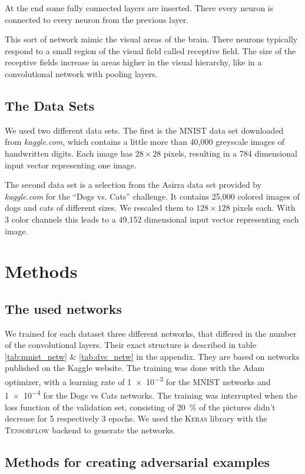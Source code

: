 \documentclass[%
 reprint,
 amsmath,amssymb,
 aps,
]{revtex4-1}
\begin{document}
At the end some fully connected layers are inserted. There every neuron is connected to every neuron from the previous layer.

This sort of network mimic the visual areas of the brain. There neurons typically respond to a small region of the visual field called receptive field. The size of the receptive fields increase in areas higher in the visual hierarchy, like in a convolutional network with pooling layers.

\subsection{The Data Sets}

We used two different data sets. The first is the MNIST data set downloaded from \emph{kaggle.com}, which contains a little more than 40,000 greyscale images of handwritten digits. Each image has $28\times 28$ pixels, resulting in a 784 dimensional input vector representing one image. 

The second data set is a selection from the Asirra data set provided by \emph{kaggle.com} for the ``Dogs vs. Cats'' challenge. It contains 25,000 colored images of dogs and cats of different sizes. We rescaled them to $128\times 128$ pixels each. With 3 color channels this leads to a 49,152 dimensional input vector representing each image. 
\section{Methods}

\subsection{The used networks}

We trained for each dataset three different networks, that differed in the number of the convolutional layers. Their exact structure is described in table \ref{tab:mnist_netw} \& \ref{tab:dvc_netw} in the appendix. They are based on networks published on the Kaggle website. The training was done with the Adam optimizer, with a learning rate of \SI{1e-3}{} for the MNIST networks and \SI{1e-4}{} for the Dogs vs Cats networks. The training was interrupted when the loss function of the validation set, consisting of \SI{20}{\percent} of the pictures didn't decrease for 5 respectively 3 epochs. 
We used the \textsc{Keras} library with the \textsc{Tensorflow} backend to generate the networks.

\subsection{Methods for creating adversarial examples}
\end{document}
